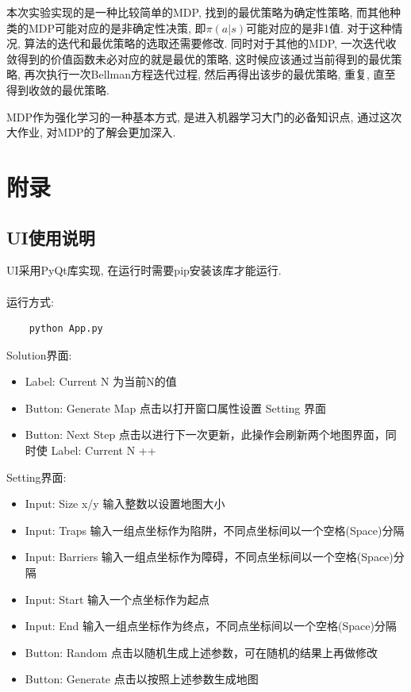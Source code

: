 \documentclass{acm_proc_article-sp}
\begin{document}
本次实验实现的是一种比较简单的MDP, 找到的最优策略为确定性策略, 
而其他种类的MDP可能对应的是非确定性决策, 即$\pi(a|s)$可能对应的是非1值.
对于这种情况, 算法的迭代和最优策略的选取还需要修改. 
同时对于其他的MDP, 一次迭代收敛得到的价值函数未必对应的就是最优的策略, 这时候应该通过当前得到的最优策略, 
再次执行一次Bellman方程迭代过程, 然后再得出该步的最优策略, 重复, 直至得到收敛的最优策略.

MDP作为强化学习的一种基本方式, 是进入机器学习大门的必备知识点, 通过这次大作业, 对MDP的了解会更加深入.

\section{附录}
\subsection{UI使用说明}
UI采用PyQt库实现, 在运行时需要pip安装该库才能运行.\\ \\
运行方式:
\begin{lstlisting}
    python App.py
\end{lstlisting}
Solution界面:
\begin{itemize}
    \item Label: Current N 为当前N的值
    \item Button: Generate Map 点击以打开窗口属性设置 Setting 界面
    \item Button: Next Step 点击以进行下一次更新，此操作会刷新两个地图界面，同时使 Label: Current N ++
\end{itemize}
Setting界面:
\begin{itemize}
    \item Input: Size x/y 输入整数以设置地图大小
    \item Input: Traps 输入一组点坐标作为陷阱，不同点坐标间以一个空格(Space)分隔
    \item Input: Barriers 输入一组点坐标作为障碍，不同点坐标间以一个空格(Space)分隔
    \item Input: Start 输入一个点坐标作为起点
    \item Input: End 输入一组点坐标作为终点，不同点坐标间以一个空格(Space)分隔
    \item Button: Random 点击以随机生成上述参数，可在随机的结果上再做修改
    \item Button: Generate 点击以按照上述参数生成地图
\end{itemize}
\end{document}
